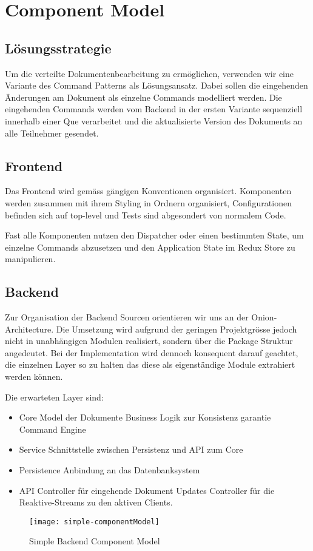 \section{Component Model}

\subsection{Lösungsstrategie}
Um die verteilte Dokumentenbearbeitung zu ermöglichen, verwenden wir eine Variante des Command Patterns als Lösungsansatz.
Dabei sollen die eingehenden Änderungen am Dokument als einzelne Commands modelliert werden.
Die eingehenden Commands werden vom Backend in der ersten Variante sequenziell innerhalb einer Que verarbeitet und die aktualisierte Version des Dokuments an alle Teilnehmer gesendet.

\subsection{Frontend}
Das Frontend wird gemäss gängigen Konventionen organisiert.
Komponenten werden zusammen mit ihrem Styling in Ordnern organisiert, Configurationen befinden sich auf top-level und Tests sind abgesondert von normalem Code.

Fast alle Komponenten nutzen den Dispatcher oder einen bestimmten State, um einzelne Commands abzusetzen und den Application State im Redux Store zu manipulieren.

\subsection{Backend}
Zur Organisation der Backend Sourcen orientieren wir uns an der Onion-Architecture.
Die Umsetzung wird aufgrund der geringen Projektgrösse jedoch nicht in unabhängigen Modulen realisiert, sondern über die Package Struktur angedeutet.
Bei der Implementation wird dennoch konsequent darauf geachtet, die einzelnen Layer so zu halten das diese als eigenständige Module extrahiert werden können.

Die erwarteten Layer sind:
\begin{itemize}
    \item Core
    \subitem Model der Dokumente
    \subitem Business Logik zur Konsistenz garantie
    \subitem Command Engine
    \item Service
    \subitem Schnittstelle zwischen Persistenz und API zum Core
    \item Persistence
    \subitem Anbindung an das Datenbanksystem
    \item API
    \subitem Controller für eingehende Dokument Updates
    \subitem Controller für die Reaktive-Streams zu den aktiven Clients.
\end{itemize}

\begin{figure}
    \texttt{[image: simple-componentModel]}
    \caption{Simple Backend Component Model}
\end{figure}
